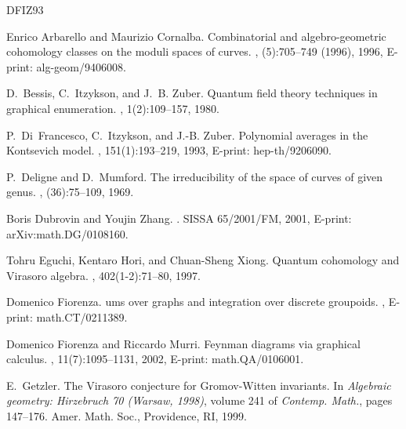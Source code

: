 \documentclass[11pt,twoside]{article}
\theoremstyle{plain}
\theoremstyle{remark}
\theoremstyle{definition}
\numberwithin{equation}{section} %
\begin{document}
%
%
\begin{thebibliography}{DFIZ93}

Enrico Arbarello and Maurizio Cornalba.
\newblock Combinatorial and algebro-geometric cohomology classes on the moduli
  spaces of curves.
, (5):705--749 (1996), 1996, E-print:
  alg-geom/9406008.

D.~Bessis, C.~Itzykson, and J.~B. Zuber.
\newblock Quantum field theory techniques in graphical enumeration.
, 1(2):109--157, 1980.

P.~Di~Francesco, C.~Itzykson, and J.-B. Zuber.
\newblock Polynomial averages in the {K}ontsevich model.
, 151(1):193--219, 1993, E-print:
  hep-th/9206090.

P.~Deligne and D.~Mumford.
\newblock The irreducibility of the space of curves of given genus.
, (36):75--109, 1969.

Boris Dubrovin and Youjin Zhang.
.
\newblock SISSA 65/2001/FM, 2001, E-print: arXiv:math.DG/0108160.

Tohru Eguchi, Kentaro Hori, and Chuan-Sheng Xiong.
\newblock Quantum cohomology and {V}irasoro algebra.
, 402(1-2):71--80, 1997.

Domenico Fiorenza.
ums over graphs and integration over discrete groupoids.
, E-print: math.CT/0211389.

Domenico Fiorenza and Riccardo Murri.
\newblock Feynman diagrams via graphical calculus.
, 11(7):1095--1131, 2002, E-print:
  math.QA/0106001.

E.~Getzler.
\newblock The {V}irasoro conjecture for {G}romov-{W}itten invariants.
\newblock In {\em Algebraic geometry: Hirzebruch 70 (Warsaw, 1998)}, volume 241
  of {\em Contemp. Math.}, pages 147--176. Amer. Math. Soc., Providence, RI,
  1999.


\end{thebibliography}
\end{document}
